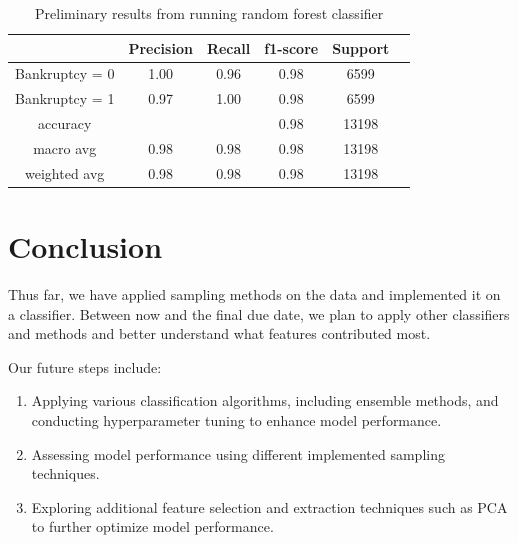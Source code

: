 \documentclass{article}
\begin{document}
\begin{table}
  \caption{Preliminary results from running random forest classifier}
  \label{table:results}
  \centering
  
  \begin{tabular}{cccccc}
    \toprule
     & \textbf{Precision} & \textbf{Recall} & \textbf{f1-score} & \textbf{Support}  \\ 
    \midrule
    Bankruptcy = 0 & 1.00 & 0.96 & 0.98 & 6599 \\ 
    Bankruptcy = 1 & 0.97 & 1.00 & 0.98 & 6599 \\
    accuracy & & & 0.98 & 13198\\
    macro avg & 0.98 & 0.98 & 0.98 & 13198\\ 
    weighted avg & 0.98 & 0.98 & 0.98 & 13198\\
    \bottomrule
  \end{tabular}
  \end{table}


\section{Conclusion}
\label{sec:conclusion}

Thus far, we have applied sampling methods on the data and implemented it on a classifier. 
Between now and the final due date, we plan to apply other classifiers and methods and better understand what features contributed most.

Our future steps include:
\begin{enumerate}
  \item Applying various classification algorithms, including ensemble methods, and conducting hyperparameter tuning to enhance model performance.
  \item Assessing model performance using different implemented sampling techniques.
  \item Exploring additional feature selection and extraction techniques such as PCA to further optimize model performance.
  
\end{enumerate}







\end{document}
